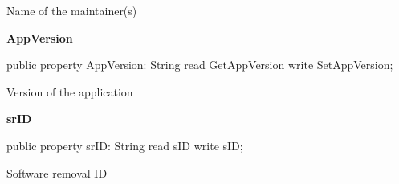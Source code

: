 \documentclass{report}
\newif\ifpdf
\begin{document}
\begin{list}{}
\par Name of the maintainer(s)\label{lentries.TListEntry-AppVersion}
\item[\textbf{AppVersion}\hfill]
\ifpdf
\begin{flushleft}
\fi
\begin{ttfamily}
public property AppVersion: String read GetAppVersion write SetAppVersion;\end{ttfamily}

\ifpdf
\end{flushleft}
\fi


\par Version of the application\label{lentries.TListEntry-srID}
\item[\textbf{srID}\hfill]
\ifpdf
\begin{flushleft}
\fi
\begin{ttfamily}
public property srID: String read sID write sID;\end{ttfamily}

\ifpdf
\end{flushleft}
\fi


\par Software removal ID\end{list}
\end{document}
